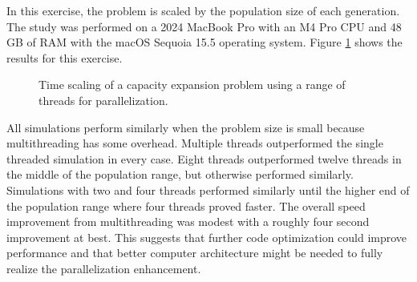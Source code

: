 \noindent In this exercise, the problem is scaled by the population size of each
generation. The study was performed on a 2024 MacBook Pro with an M4 Pro CPU and 48 GB of
RAM with the macOS Sequoia 15.5 operating system.
Figure \ref{fig:thread-scaling} shows the results for this exercise.

\begin{figure}[htbp!]
    \centering
    \resizebox{0.75\columnwidth}{!}{}
    \caption{Time scaling of a capacity expansion problem 
    using a range of threads for parallelization.}
    \label{fig:thread-scaling}
\end{figure}

\noindent All simulations perform similarly when the problem size is small because multithreading
has some overhead. Multiple threads outperformed the single threaded simulation in every case. 
Eight threads outperformed twelve threads in the middle of the population range, but otherwise 
performed similarly. Simulations with two and four threads performed similarly until the higher
end of the population range where four threads proved faster. The overall speed improvement from multithreading
was modest with a roughly four second improvement at best. This suggests that further code optimization
could improve performance and that better computer architecture might be needed to fully realize
the parallelization enhancement.

\FloatBarrier